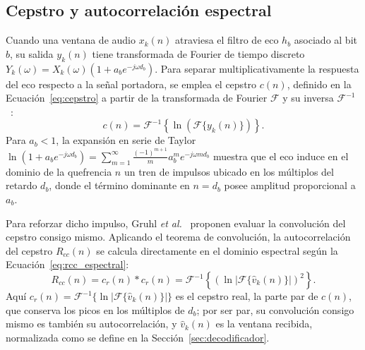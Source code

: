 \subsection{Cepstro y autocorrelación espectral}

Cuando una ventana de audio $x_k(n)$ atraviesa el filtro de eco $h_b$ asociado al bit $b$, su salida $y_k(n)$ tiene transformada de Fourier de tiempo discreto $Y_k(\omega) = X_k(\omega)\left(1 + a_b e^{-j\omega d_b}\right)$. Para separar multiplicativamente la respuesta del eco respecto a la señal portadora, se emplea el cepstro $c(n)$, definido en la Ecuación~\eqref{eq:cepstro} a partir de la transformada de Fourier $\mathcal{F}$ y su inversa $\mathcal{F}^{-1}$~\cite{gruhl_echo_hiding}:
\begin{equation}
c(n) = \mathcal{F}^{-1}\left\{\ln\left(\mathcal{F}\{y_k(n)\}\right)\right\}.
\label{eq:cepstro}
\end{equation}
Para $a_b < 1$, la expansión en serie de Taylor $\ln(1 + a_b e^{-j\omega d_b}) = \sum_{m=1}^{\infty} \frac{(-1)^{m+1}}{m} a_b^m e^{-j\omega m d_b}$ muestra que el eco induce en el dominio de la quefrencia $n$ un tren de impulsos ubicado en los múltiplos del retardo $d_b$, donde el término dominante en $n = d_b$ posee amplitud proporcional a $a_b$.

Para reforzar dicho impulso, Gruhl \textit{et al.}~\cite{gruhl_echo_hiding} proponen evaluar la convolución del cepstro consigo mismo. Aplicando el teorema de convolución, la autocorrelación del cepstro $R_{cc}(n)$ se calcula directamente en el dominio espectral según la Ecuación~\eqref{eq:rcc_espectral}:
\begin{equation}
R_{cc}(n) = c_r(n) * c_r(n) = \mathcal{F}^{-1}\left\{\left(\ln\left|\mathcal{F}\{\hat{v}_k(n)\}\right|\right)^2\right\}.
\label{eq:rcc_espectral}
\end{equation}
Aquí $c_r(n) = \mathcal{F}^{-1}\{\ln|\mathcal{F}\{\hat{v}_k(n)\}|\}$ es el cepstro real, la parte par de $c(n)$, que conserva los picos en los múltiplos de $d_b$; por ser par, su convolución consigo mismo es también su autocorrelación, y $\hat{v}_k(n)$ es la ventana recibida, normalizada como se define en la Sección~\ref{sec:decodificador}.
